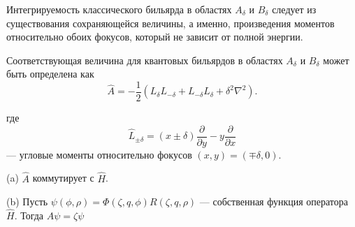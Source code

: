  
\begin{frame} 


Интегрируемость классического бильярда в областях $A_\delta$ и $B_\delta$ следует из существования сохраняющейся величины, а именно, произведения моментов относительно обоих фокусов, который не зависит от полной энергии. 




Соответствующая величина для квантовых бильярдов в областях
 $A_\delta$ и $B_\delta$ может быть определена как
\begin{equation*}
\hat A = -\frac{1}{2}(L_\delta L_{-\delta} + L_{-\delta} L_\delta + \delta^2 \nabla ^2).
\end{equation*}

где  $$\hat L_{\pm \delta} = (x \pm \delta)\frac{\partial}{\partial y} - y\frac{\partial}{\partial x}$$ 
--- угловые моменты относительно фокусов $(x,y) = (\mp \delta, 0)$.


\begin{mytheorem}[C]
\label{th:L}
(a) $\hat A$ коммутирует с  $\hat H$.

(b) Пусть   $\psi(\phi, \rho) = \Phi(\zeta, q, \phi) R(\zeta, q, \rho)$ --- собственная функция оператора $\hat H$. %
Тогда
$\hat A \psi = \zeta \psi$
\end{mytheorem}

\end{frame} 
